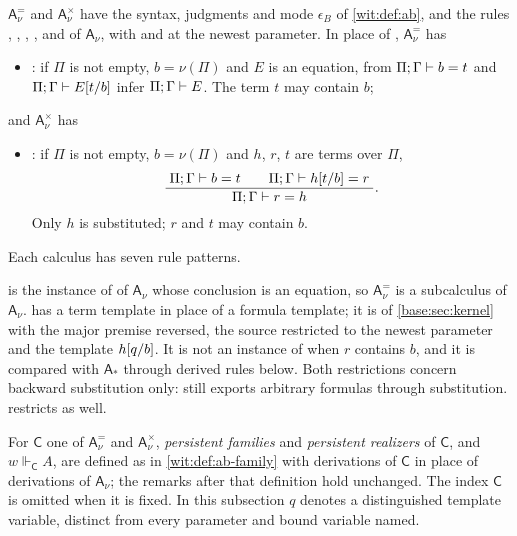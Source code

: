 \begin{definition}[The calculi $\mathsf{A}^{=}_{\nu}$ and
$\mathsf{A}^{\times}_{\nu}$]
\label{wit:def:eqback}
$\mathsf{A}^{=}_{\nu}$ and $\mathsf{A}^{\times}_{\nu}$ have the syntax,
judgments and mode $\epsilon_B$ of \cref{wit:def:ab}, and the rules
, , , ,
 and  of $\mathsf{A}_{\nu}$, with
 and  at the newest parameter.  In place of
, $\mathsf{A}^{=}_{\nu}$ has
\begin{itemize}
\item {}: if $\Pi$ is not empty, $b=\nu(\Pi)$ and $E$ is an
 equation, from $\Pi;\Gamma\vdash b=t$ and $\Pi;\Gamma\vdash E[t/b]$
 infer $\Pi;\Gamma\vdash E$.  The term $t$ may contain $b$;
\end{itemize}
and $\mathsf{A}^{\times}_{\nu}$ has
\begin{itemize}
\item {}: if $\Pi$ is not empty, $b=\nu(\Pi)$ and $h$, $r$, $t$
 are terms over $\Pi$,
 \[
  \dfrac{\;\Pi;\Gamma\vdash b=t\qquad \Pi;\Gamma\vdash h[t/b]=r\;}{\;\Pi;\Gamma\vdash r=h\;}.
 \]
 Only $h$ is substituted; $r$ and $t$ may contain $b$.
\end{itemize}
Each calculus has seven rule patterns.
\end{definition}

 is the instance of  of $\mathsf{A}_{\nu}$
whose conclusion is an equation, so $\mathsf{A}^{=}_{\nu}$ is a subcalculus of
$\mathsf{A}_{\nu}$.   has a term template in place of a
formula template; it is  of \cref{base:sec:kernel} with the
major premise reversed, the source restricted to the newest parameter and
the template $h[q/b]$.  It is not an instance of  when
$r$ contains $b$, and it is compared with $\mathsf{A}_{\ast}$ through derived
rules below.  Both restrictions concern backward substitution only:
 still exports arbitrary formulas through substitution.
 restricts  as well.

For $\mathsf{C}$ one of $\mathsf{A}^{=}_{\nu}$ and $\mathsf{A}^{\times}_{\nu}$,
\emph{persistent families} and \emph{persistent realizers} of $\mathsf{C}$,
and $w\Vdash_{\mathsf{C}}A$, are defined as in \cref{wit:def:ab-family} with
derivations of $\mathsf{C}$ in place of derivations of $\mathsf{A}_{\nu}$;
the remarks after that definition hold unchanged.  The index $\mathsf{C}$ is
omitted when it is fixed.  In this subsection $q$ denotes a distinguished
template variable, distinct from every parameter and bound variable named.

